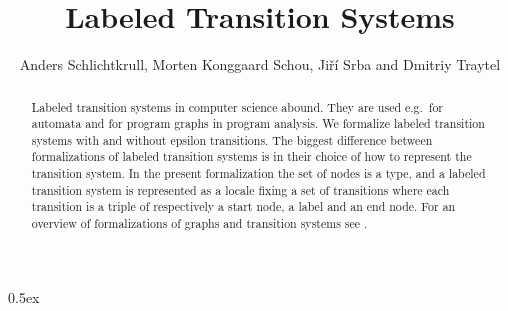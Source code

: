 \documentclass[10pt,a4paper]{article}
\begin{document}
\title{Labeled Transition Systems}
\author{Anders Schlichtkrull, Morten Konggaard Schou, Ji\v{r}\'i Srba and Dmitriy Traytel}
\date{}

\maketitle

\begin{abstract}
\noindent
Labeled transition systems in computer science abound. They are used e.g.\ for automata and for program graphs in program analysis.
We formalize labeled transition systems with and without epsilon transitions.
The biggest difference between formalizations of labeled transition systems is in their choice of how to represent the transition system.
In the present formalization the set of nodes is a type, and a labeled transition system is represented as a locale fixing a set 
of transitions where each transition is a triple of respectively a start node, a label and an end node.
For an overview of formalizations of graphs and transition systems see \cite{graphs}.

\end{abstract}

\tableofcontents

\newpage

\parindent 0pt
\parskip 0.5ex

\newpage





\end{document}
